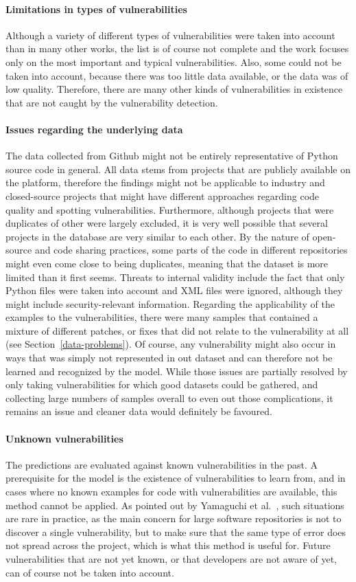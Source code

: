 \documentclass[
a4paper,
pagesize,
pdftex,
12pt,
twoside, %
BCOR=5mm, %
ngerman,
fleqn,
final,
]{scrartcl}
\begin{document}
	\paragraph{Limitations in types of vulnerabilities}
	Although a variety of different types of vulnerabilities were taken into account than in many other works, the list is of course not complete and the work focuses only on the most important and typical vulnerabilities. Also, some could not be taken into account, because there was too little data available, or the data was of low quality. Therefore, there are many other kinds of vulnerabilities in existence that are not caught by the vulnerability detection. 
	\paragraph{Issues regarding the underlying data}
	The data collected from Github might not be entirely representative of Python source code in general. All data stems from projects that are publicly available on the platform, therefore the findings might not be applicable to industry and closed-source projects that might have different approaches regarding code quality and spotting vulnerabilities. Furthermore, although projects that were duplicates of other were largely excluded, it is very well possible that several projects in the database are very similar to each other. By the nature of open-source and code sharing practices, some parts of the code in different repositories might even come close to being duplicates, meaning that the dataset is more limited than it first seems. Threats to internal validity include the fact that only Python files were taken into account and XML files were ignored, although they might include security-relevant information. Regarding the applicability of the examples to the vulnerabilities, there were many samples that contained a mixture of different patches, or fixes that did not relate to the vulnerability at all (see Section~\ref{data-problems}). Of course, any vulnerability might also occur in ways that was simply not represented in out dataset and can therefore not be learned and recognized by the model. While those issues are partially resolved by only taking vulnerabilities for which good datasets could be gathered, and collecting large numbers of samples overall to even out those complications, it remains an issue and cleaner data would definitely be favoured.
	\paragraph{Unknown vulnerabilities}
	The predictions are evaluated against known vulnerabilities in the past. A prerequisite for the model is the existence of vulnerabilities to learn from, and in cases where no known examples for code with vulnerabilities are available, this method cannot be applied. As pointed out by Yamaguchi et al.~\cite{Yamaguchi.2012}, such situations are rare in practice, as the main concern for large software repositories is not to discover a single vulnerability, but to make sure that the same type of error does not spread across the project, which is what this method is useful for. Future vulnerabilities that are not yet known, or that developers are not aware of yet, can of course not be taken into account.
\end{document}
